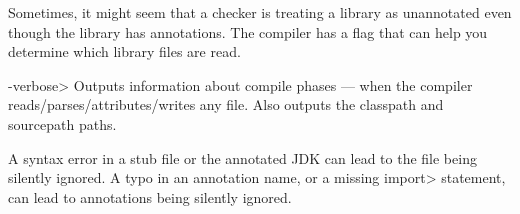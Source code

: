 
Sometimes, it might seem that a checker is treating a library as unannotated
even though the library has annotations.  The compiler has a flag that
can help you determine which library files are read.

\begin{description}
\item \<-verbose>
  Outputs information about compile phases --- when the compiler
  reads/parses/attributes/writes any file.  Also outputs the classpath and
  sourcepath paths.
\end{description}

A syntax error in a stub file or the annotated JDK can lead to the file
being silently ignored.  A typo in an annotation name, or a missing
\<import> statement, can lead to annotations being silently ignored.


